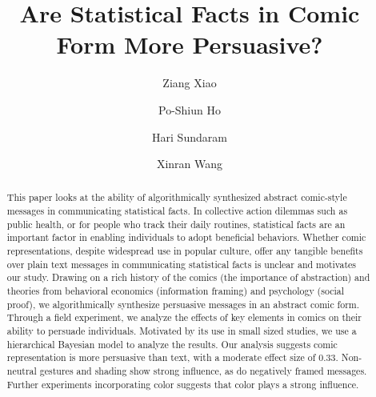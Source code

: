\documentclass[format=acmsmall, natbib=false, review=false, anonymous=true, screen=true]{acmart}
\begin{document}
\title[Statistical Facts in Comic form]{Are Statistical Facts in Comic Form More Persuasive?}


\author{Ziang Xiao}
\author{Po-Shiun Ho}
\author{Hari Sundaram}
\author{Xinran Wang}




\begin{abstract}
 This paper looks at the ability of algorithmically synthesized abstract comic-style messages in communicating statistical facts. In collective action dilemmas such as public health, or for people who track their daily routines, statistical facts are an important factor in enabling individuals to adopt beneficial behaviors. Whether comic representations, despite widespread use in popular culture, offer any tangible benefits over plain text messages in communicating statistical facts is unclear and motivates our study. Drawing on a rich history of the comics (the importance of abstraction) and theories from behavioral economics (information framing) and psychology (social proof), we algorithmically synthesize persuasive messages in an abstract comic form. Through a field experiment, we analyze the effects of key elements in comics on their ability to persuade individuals. Motivated by its use in small sized studies, we use a hierarchical Bayesian model to analyze the results. Our analysis suggests comic representation is more persuasive than text, with a moderate effect size of 0.33. Non-neutral gestures and shading show strong influence, as do negatively framed messages. Further experiments incorporating color suggests that color plays a strong influence.
\end{abstract}
\end{document}
